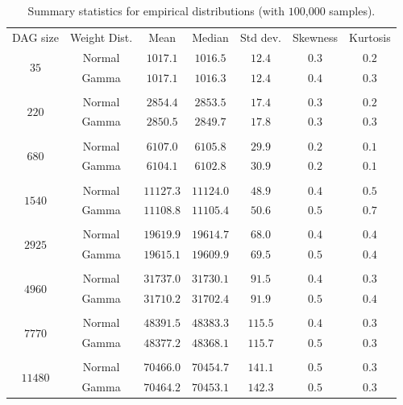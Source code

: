 \documentclass[12pt]{article}
\begin{document}
 \begin{table}
	\caption{Summary statistics for empirical distributions (with $100$,$000$ samples).} 
	\begin{center}	
		\begin{tabular}{c c c c c c c}
                  \toprule
                  DAG size & Weight Dist. & Mean & Median & Std dev. & Skewness & Kurtosis \\
                  \cmidrule{1-7}
                  \multirow{2}{*}{$35$} & Normal & $1017.1$ & $1016.5$ & $12.4$ & $0.3$ & $0.2$\\
                           & Gamma & $1017.1$ & $1016.3$ & $12.4$ & $0.4$ & $0.3$\\
                  \\
                  \multirow{2}{*}{$220$} & Normal & $2854.4$ & $2853.5$ & $17.4$ & $0.3$ & $0.2$\\
                           & Gamma & $2850.5$ & $2849.7$ & $17.8$ & $0.3$ & $0.3$\\
                  \\
                  \multirow{2}{*}{$680$} & Normal & $6107.0$ & $6105.8$ & $29.9$ & $0.2$ & $0.1$\\
                           & Gamma & $6104.1$ & $6102.8$ & $30.9$ & $0.2$ & $0.1$\\
                  \\
                  \multirow{2}{*}{$1540$} & Normal & $11127.3$ & $11124.0$ & $48.9$ & $0.4$ & $0.5$\\
                           & Gamma & $11108.8$ & $11105.4$ & $50.6$ & $0.5$ & $0.7$\\
                  \\
                  \multirow{2}{*}{$2925$} & Normal & $19619.9$ & $19614.7$ & $68.0$ & $0.4$ & $0.4$\\
                           & Gamma & $19615.1$ & $19609.9$ & $69.5$ & $0.5$ & $0.4$\\
                  \\
                  \multirow{2}{*}{$4960$} & Normal & $31737.0$ & $31730.1$ & $91.5$ & $0.4$ & $0.3$\\
                           & Gamma & $31710.2$ & $31702.4$ & $91.9$ & $0.5$ & $0.4$\\
                  \\
                  \multirow{2}{*}{$7770$} & Normal & $48391.5$ & $48383.3$ & $115.5$ & $0.4$ & $0.3$\\
                           & Gamma & $48377.2$ & $48368.1$ & $115.7$ & $0.5$ & $0.3$\\
                  \\
                  \multirow{2}{*}{$11480$} & Normal & $70466.0$ & $70454.7$ & $141.1$ & $0.5$ & $0.3$\\
                           & Gamma & $70464.2$ & $70453.1$ & $142.3$ & $0.5$ & $0.3$\\
		\bottomrule
		\end{tabular}
		\label{tb.emp_summary}
	\end{center}	
      \end{table}
\end{document}
